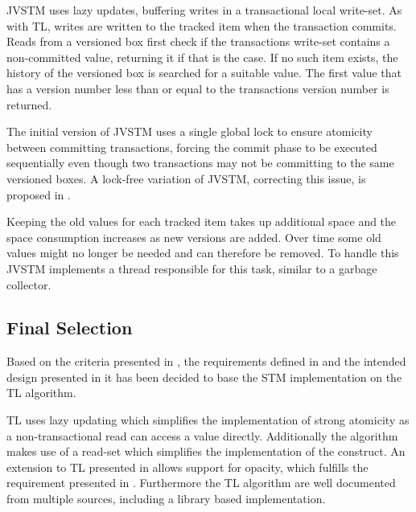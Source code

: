 JVSTM uses lazy updates, buffering writes in a transactional local write-set\cite[p. 64]{cachopo2007development}. As with TL, writes are written to the tracked item when the transaction commits. Reads from a versioned box first check if the transactions write-set contains a non-committed value, returning it if that is the case\cite[p. 64]{cachopo2007development}. If no such item exists, the history of the versioned box is searched for a suitable value. The first value that has a version number less than or equal to the transactions version number is returned\cite[p. 64]{cachopo2007development}.

The initial version of JVSTM uses a single global lock to ensure atomicity between committing transactions\cite[p. 70]{cachopo2007development}, forcing the commit phase to be executed sequentially even though two transactions may not be committing to the same versioned boxes. A lock-free variation of JVSTM, correcting this issue, is proposed in \cite{fernandes2011lock}.

Keeping the old values for each tracked item takes up additional space and the space consumption increases as new versions are added. Over time some old values might no longer be needed and can therefore be removed. To handle this JVSTM implements a thread responsible for this task\cite[p. 70]{cachopo2007development}\cite[p. 88]{cachopo2007development}, similar to a garbage collector\cite[p. 472]{fischer2009crafting}.

\subsection{Final Selection}
Based on the criteria presented in , the requirements defined in  and the intended design presented in  it has been decided to base the \ac{STM} implementation on the TL algorithm. 

TL uses lazy updating which simplifies the implementation of strong atomicity as a non-transactional read can access a value directly. Additionally the algorithm makes use of a read-set which simplifies the implementation of the  construct. An extension to TL presented in \cite[p. 107]{harris2010transactional} allows support for opacity, which fulfills the requirement presented in . Furthermore the TL algorithm are well documented from multiple sources, including a library based implementation\cite{dice2006transactional}\cite[p. 438]{herlihy2012art}\cite[p. 106]{harris2010transactional}.


